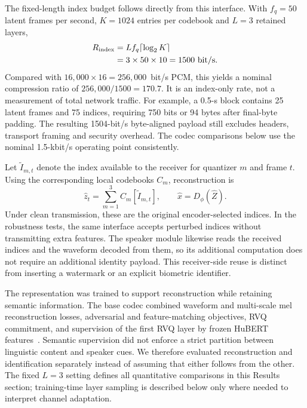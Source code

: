 The fixed-length index budget follows directly from this interface. With $f_q=50$ latent frames per second, $K=1024$ entries per codebook and $L=3$ retained layers,
\begin{equation}
\begin{aligned}
R_{\rm index}
 &=Lf_q\lceil\log_2 K\rceil\\
 &=3\times50\times10=1500\ {\rm bit/s}.
\end{aligned}
\label{eq:rv2-rate}
\end{equation}
Compared with $16{,}000\times16=256{,}000$~bit/s PCM, this yields a nominal compression ratio of $256{,}000/1500=170.7$. It is an index-only rate, not a measurement of total network traffic. For example, a 0.5-s block contains 25 latent frames and 75 indices, requiring 750 bits or 94 bytes after final-byte padding. The resulting 1504-bit/s byte-aligned payload still excludes headers, transport framing and security overhead. The codec comparisons below use the nominal 1.5-kbit/s operating point consistently.

Let $\widetilde I_{m,t}$ denote the index available to the receiver for quantizer $m$ and frame $t$. Using the corresponding local codebooks $C_m$, reconstruction is
\begin{equation}
\hat z_t=\sum_{m=1}^{3} C_m[\widetilde I_{m,t}],
\qquad \hat x=D_\phi(\hat Z).
\label{eq:rv2-reconstruction}
\end{equation}
Under clean transmission, these are the original encoder-selected indices. In the robustness tests, the same interface accepts perturbed indices without transmitting extra features. The speaker module likewise reads the received indices and the waveform decoded from them, so its additional computation does not require an additional identity payload. This receiver-side reuse is distinct from inserting a watermark or an explicit biometric identifier.

The representation was trained to support reconstruction while retaining semantic information. The base codec combined waveform and multi-scale mel reconstruction losses, adversarial and feature-matching objectives, RVQ commitment, and supervision of the first RVQ layer by frozen HuBERT features~\cite{hubert}. Semantic supervision did not enforce a strict partition between linguistic content and speaker cues. We therefore evaluated reconstruction and identification separately instead of assuming that either follows from the other. The fixed $L=3$ setting defines all quantitative comparisons in this Results section; training-time layer sampling is described below only where needed to interpret channel adaptation.

